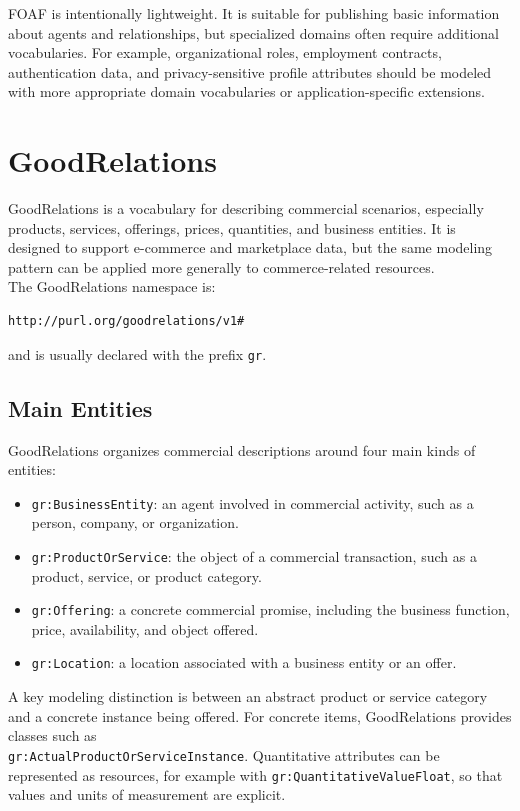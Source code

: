 \documentclass{scrbook}
\begin{document}
	FOAF is intentionally lightweight. It is suitable for publishing basic information about agents and relationships, but specialized domains often require additional vocabularies. For example, organizational roles, employment contracts, authentication data, and privacy-sensitive profile attributes should be modeled with more appropriate domain vocabularies or application-specific extensions.
	
	\section{GoodRelations}
	
	GoodRelations is a vocabulary for describing commercial scenarios, especially products, services, offerings, prices, quantities, and business entities. It is designed to support e-commerce and marketplace data, but the same modeling pattern can be applied more generally to commerce-related resources.\\
	
	The GoodRelations namespace is:
	
	\begin{lstlisting}
http://purl.org/goodrelations/v1#
	\end{lstlisting}
	
	and is usually declared with the prefix \texttt{gr}.
	
	\subsection{Main Entities}
	
	GoodRelations organizes commercial descriptions around four main kinds of entities:
	
	\begin{itemize}
	    \item \texttt{gr:BusinessEntity}: an agent involved in commercial activity, such as a person, company, or organization.
	    \item \texttt{gr:ProductOrService}: the object of a commercial transaction, such as a product, service, or product category.
	    \item \texttt{gr:Offering}: a concrete commercial promise, including the business function, price, availability, and object offered.
	    \item \texttt{gr:Location}: a location associated with a business entity or an offer.
	\end{itemize}
	
	A key modeling distinction is between an abstract product or service category and a concrete instance being offered. For concrete items, GoodRelations provides classes such as\\
	\texttt{gr:ActualProductOrServiceInstance}. Quantitative attributes can be represented as resources, for example with \texttt{gr:QuantitativeValueFloat}, so that values and units of measurement are explicit.
	
\end{document}
